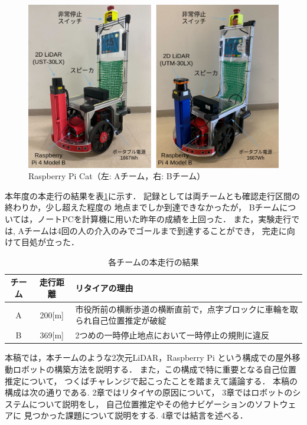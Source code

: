 \documentclass[twocolumn,9pt]{jsproceedings}
\begin{document}
\begin{figure}[h]
 	\begin{center}
 		\includegraphics[width=1.0\linewidth]{figs/raspicat.pdf}
 		\caption{Raspberry Pi Cat（左: Aチーム，右: Bチーム）}
 		\label{fig:raspicat}
 	\end{center}
\end{figure}

本年度の本走行の結果を表\ref{MainRun}に示す．
記録としては両チームとも確認走行区間の終わりか，少し超えた程度の
地点までしか到達できなかったが，
Bチームについては，ノートPCを計算機に用いた昨年の成績を上回った．
また，実験走行では, Aチームは4回の人の介入のみでゴールまで到達することができ，
完走に向けて目処が立った．

\begin{table}[h]
  \caption{各チームの本走行の結果}
  \label{MainRun}
	\begin{tabular}{|c|c|p{5.4cm}|}
    \hline
	チーム & 走行距離 & リタイアの理由 \\
    \hline
	A & 200[m] & 市役所前の横断歩道の横断直前で，点字ブロックに車輪を取られ自己位置推定が破綻\\
    \hline
	B & 369[m] & 2つめの一時停止地点において一時停止の規則に違反 \\ 
    \hline
  \end{tabular}
\end{table}


本稿では，本チームのような2次元LiDAR，Raspberry Pi
という構成での屋外移動ロボットの構築方法を説明する．
また，この構成で特に重要となる自己位置推定について，
つくばチャレンジで起こったことを踏まえて議論する．
本稿の構成は次の通りである. 
2章ではリタイヤの原因について，
3章ではロボットのシステムについて説明をし，
自己位置推定やその他ナビゲーションのソフトウェアに
見つかった課題について説明をする. 
4章では結言を述べる．
\end{document}
